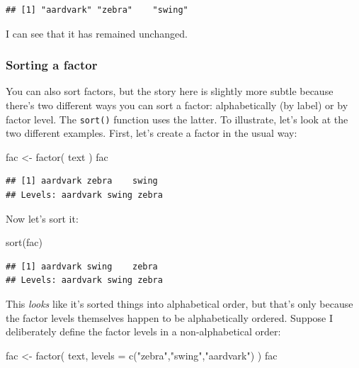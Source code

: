 \documentclass[
]{book}
\newenvironment{Shaded}{\begin{snugshade}}{\end{snugshade}}
\newcommand{\AttributeTok}[1]{\textcolor[rgb]{0.77,0.63,0.00}{#1}}
\newcommand{\FunctionTok}[1]{\textcolor[rgb]{0.00,0.00,0.00}{#1}}
\newcommand{\NormalTok}[1]{#1}
\newcommand{\OtherTok}[1]{\textcolor[rgb]{0.56,0.35,0.01}{#1}}
\newcommand{\StringTok}[1]{\textcolor[rgb]{0.31,0.60,0.02}{#1}}
\begin{document}
\begin{verbatim}
## [1] "aardvark" "zebra"    "swing"
\end{verbatim}

I can see that it has remained unchanged.

\hypertarget{sorting-a-factor}{%
\subsubsection{Sorting a factor}\label{sorting-a-factor}}

You can also sort factors, but the story here is slightly more subtle because there's two different ways you can sort a factor: alphabetically (by label) or by factor level. The \texttt{sort()} function uses the latter. To illustrate, let's look at the two different examples. First, let's create a factor in the usual way:

\begin{Shaded}
\begin{Highlighting}[]
\NormalTok{fac }\OtherTok{\textless{}{-}} \FunctionTok{factor}\NormalTok{( text )}
\NormalTok{fac}
\end{Highlighting}
\end{Shaded}

\begin{verbatim}
## [1] aardvark zebra    swing   
## Levels: aardvark swing zebra
\end{verbatim}

Now let's sort it:

\begin{Shaded}
\begin{Highlighting}[]
\FunctionTok{sort}\NormalTok{(fac)}
\end{Highlighting}
\end{Shaded}

\begin{verbatim}
## [1] aardvark swing    zebra   
## Levels: aardvark swing zebra
\end{verbatim}

This \emph{looks} like it's sorted things into alphabetical order, but that's only because the factor levels themselves happen to be alphabetically ordered. Suppose I deliberately define the factor levels in a non-alphabetical order:

\begin{Shaded}
\begin{Highlighting}[]
\NormalTok{fac }\OtherTok{\textless{}{-}} \FunctionTok{factor}\NormalTok{( text, }\AttributeTok{levels =} \FunctionTok{c}\NormalTok{(}\StringTok{"zebra"}\NormalTok{,}\StringTok{"swing"}\NormalTok{,}\StringTok{"aardvark"}\NormalTok{) )}
\NormalTok{fac}
\end{Highlighting}
\end{Shaded}
\end{document}
